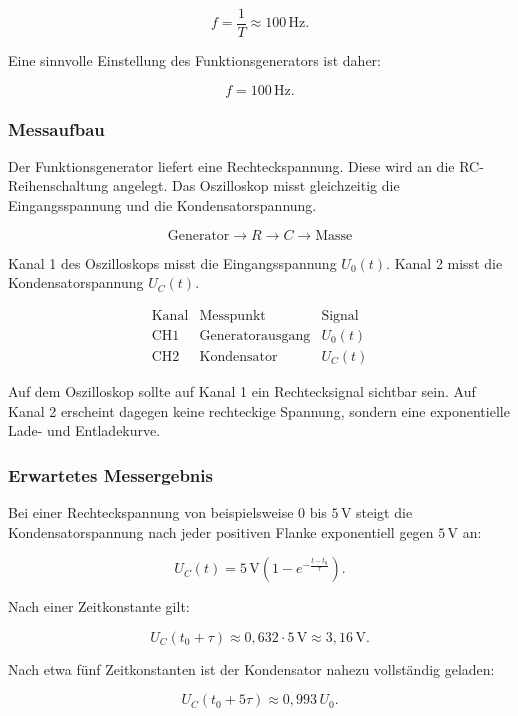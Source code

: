 \[
f=\frac{1}{T}\approx 100\,\text{Hz}.
\]

Eine sinnvolle Einstellung des Funktionsgenerators ist daher:

\[
f = 100\,\text{Hz}.
\]

\subsubsection{Messaufbau}
\label{subsubsec:messaufbau-rc-oszilloskop}

Der Funktionsgenerator liefert eine Rechteckspannung. Diese wird an die
RC-Reihenschaltung angelegt. Das Oszilloskop misst gleichzeitig die
Eingangsspannung und die Kondensatorspannung.

\[
\text{Generator} \rightarrow R \rightarrow C \rightarrow \text{Masse}
\]

Kanal 1 des Oszilloskops misst die Eingangsspannung $U_0(t)$.
Kanal 2 misst die Kondensatorspannung $U_C(t)$.

\[
\begin{array}{c|c|c}
	\text{Kanal} & \text{Messpunkt} & \text{Signal} \\
	\hline
	\text{CH1} & \text{Generatorausgang} & U_0(t) \\
	\text{CH2} & \text{Kondensator} & U_C(t)
\end{array}
\]

Auf dem Oszilloskop sollte auf Kanal 1 ein Rechtecksignal sichtbar sein.
Auf Kanal 2 erscheint dagegen keine rechteckige Spannung, sondern eine
exponentielle Lade- und Entladekurve.

\subsubsection{Erwartetes Messergebnis}
\label{subsubsec:erwartetes-messergebnis-rc}

Bei einer Rechteckspannung von beispielsweise $0$ bis $5\,\text{V}$ steigt die
Kondensatorspannung nach jeder positiven Flanke exponentiell gegen
$5\,\text{V}$ an:

\[
U_C(t)=5\,\text{V}\left(1-e^{-\frac{t-t_0}{\tau}}\right).
\]

Nach einer Zeitkonstante gilt:

\[
U_C(t_0+\tau)
\approx
0{,}632 \cdot 5\,\text{V}
\approx
3{,}16\,\text{V}.
\]

Nach etwa fünf Zeitkonstanten ist der Kondensator nahezu vollständig geladen:

\[
U_C(t_0+5\tau)\approx 0{,}993\,U_0.
\]

